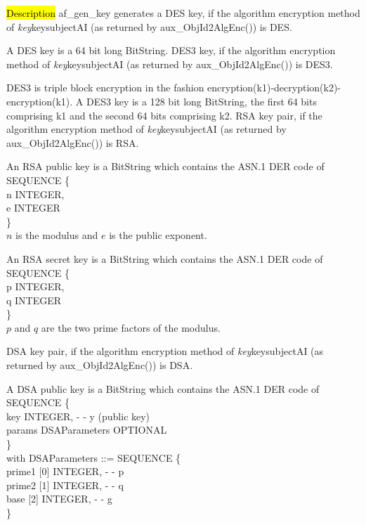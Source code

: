 \hl{Description}
af\_gen\_key generates a
\bi
\m  DES key, 
    if the algorithm encryption method 
    of {\em key}\pf key\pf subjectAI (as returned by aux\_ObjId2AlgEnc()) is DES.
 
    A DES key is a 64 bit long BitString.
\m  DES3 key, 
    if the algorithm encryption method 
    of {\em key}\pf key\pf subjectAI (as returned by aux\_ObjId2AlgEnc()) is DES3.
 
    DES3 is triple block encryption in the fashion encryption(k1)-decryption(k2)-encryption(k1).
    A DES3 key is a 128 bit long BitString, the first 64 bits comprising k1 and the
    second 64 bits comprising k2.
\m  RSA key pair, 
    if the algorithm encryption method 
    of {\em key}\pf key\pf subjectAI (as returned by aux\_ObjId2AlgEnc()) is RSA. 

    An RSA public key is a BitString
    which contains the ASN.1 DER code of
    \bvtab
    \4  SEQUENCE \{ \\
    \4  \2       n INTEGER,   \\
    \4  \2       e INTEGER  \\
    \4  \} \\
    \evtab
    $n$ is the modulus and $e$ is the public exponent.
    

    An RSA secret key is a BitString
    which contains the ASN.1 DER code of
    \bvtab
    \4  SEQUENCE \{ \\
    \4  \2       p INTEGER,   \\
    \4  \2       q INTEGER  \\
    \4  \} \\
    \evtab
    $p$ and $q$ are the two prime factors of the modulus.

\m  DSA key pair, 
    if the algorithm encryption method 
    of {\em key}\pf key\pf subjectAI (as returned by aux\_ObjId2AlgEnc()) is DSA. 

    A DSA public key is a BitString
    which contains the ASN.1 DER code of
    \bvtab
    \4  SEQUENCE \{ \\
    \4  \2       key INTEGER, - - y (public key)   \\
    \4  \2       params DSAParameters OPTIONAL  \\
    \4  \} \\
    \evtab
    with
    \bvtab
    DSAParameters ::= SEQUENCE \{ \\
    \4  \2       prime1 [0] INTEGER, - - p \\
    \4  \2       prime2 [1] INTEGER, - - q \\
    \4  \2       base [2] INTEGER, - - g \\
    \4  \} \\
    \evtab
    
